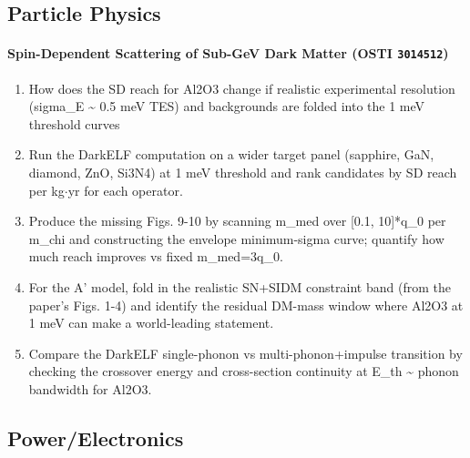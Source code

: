\documentclass[11pt]{article}
\begin{document}
\subsection*{Particle Physics}
\paragraph{Spin-Dependent Scattering of Sub-GeV Dark Matter \textnormal{\small(OSTI \texttt{3014512})}}
\begin{enumerate}[leftmargin=1.6em,itemsep=0.2em,topsep=0.2em,label=Q\arabic*.]
\item How does the SD reach for Al2O3 change if realistic experimental resolution (sigma\_E \textasciitilde{} 0.5 meV TES) and backgrounds are folded into the 1 meV threshold curves
\item Run the DarkELF computation on a wider target panel (sapphire, GaN, diamond, ZnO, Si3N4) at 1 meV threshold and rank candidates by SD reach per kg$\cdot$yr for each operator.
\item Produce the missing Figs. 9-10 by scanning m\_med over [0.1, 10]*q\_0 per m\_chi and constructing the envelope minimum-sigma curve; quantify how much reach improves vs fixed m\_med=3q\_0.
\item For the A' model, fold in the realistic SN+SIDM constraint band (from the paper's Figs. 1-4) and identify the residual DM-mass window where Al2O3 at 1 meV can make a world-leading statement.
\item Compare the DarkELF single-phonon vs multi-phonon+impulse transition by checking the crossover energy and cross-section continuity at E\_th \textasciitilde{} phonon bandwidth for Al2O3.
\end{enumerate}
\subsection*{Power/Electronics}
\end{document}
